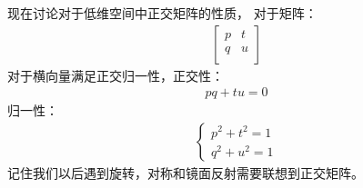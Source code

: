 \documentclass[UTF8,10pt]{article}
\begin{document}
现在讨论对于低维空间中正交矩阵的性质，
对于矩阵：
\begin{align*}
    \left[
        \begin{matrix}
            p & t \\
            q & u \\
        \end{matrix}
        \right]
\end{align*}
对于横向量满足正交归一性，正交性：
\begin{align*}
    pq+tu=0
\end{align*}
归一性：
\begin{align*}
    \left\{
    \begin{array}{c}
        p^2+t^2=1 \\
        q^2+u^2=1
    \end{array}
    \right.
\end{align*}
记住我们以后遇到旋转，对称和镜面反射需要联想到正交矩阵。
\end{document}
